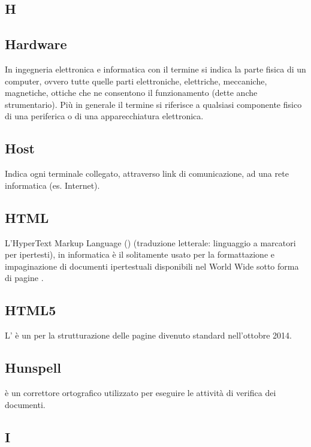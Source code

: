 \newpage

\begin{center}
\Huge\section{\uppercase{H}}
\end{center}

\subsection{Hardware}
In ingegneria elettronica e informatica con il termine  si indica la parte fisica
di un computer, ovvero tutte quelle parti elettroniche, elettriche, meccaniche, magnetiche,
ottiche che ne consentono il funzionamento (dette anche strumentario). Più in generale il
termine si riferisce a qualsiasi componente fisico di una periferica o di una apparecchiatura
elettronica.

\subsection{Host}
Indica ogni terminale collegato, attraverso link di comunicazione, ad una rete informatica (es. Internet).

\subsection{HTML}
L'HyperText Markup Language () (traduzione letterale: linguaggio a marcatori per ipertesti), in informatica è il  solitamente usato per la formattazione e impaginazione di documenti ipertestuali disponibili nel World Wide  sotto forma di pagine .

\subsection{HTML5}
L’ è un  per la strutturazione delle pagine  divenuto
standard  nell’ottobre 2014.

\subsection{Hunspell}
 è un correttore ortografico utilizzato per eseguire le attività di verifica dei documenti.

\newpage

\begin{center}
\Huge\section{\uppercase{I}}
\end{center}

